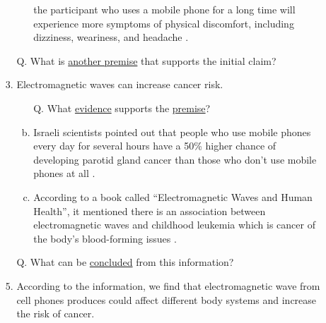 \documentclass[a4paper, 12pt]{article}
\begin{document}
\begin{CJK*}{UTF8}{bsmi}
\begin{enumerate}[I.]
\begin{enumerate}[A.]
\begin{enumerate}[1.]
\begin{enumerate}[a.]
                                                      the participant who uses a mobile phone for a long time will
                                                      experience more symptoms of physical discomfort,
                                                      including dizziness, weariness, and headache \parencite{R9631008}.
                                          \end{enumerate}
                                    \item [Q.] What is \underline{another premise} that supports the {\color{blue}initial claim}?
                                    \item Electromagnetic waves can increase cancer risk.
                                          \begin{enumerate}[a.]
                                                \item [Q.] What \underline{evidence} supports the \underline{premise}?
                                                \item Israeli scientists pointed out that people who use mobile
                                                      phones every day for several hours have a 50\% higher chance
                                                      of developing parotid gland cancer than
                                                      those who don't use mobile phones at all \parencite{epaper9706,10.1093/aje/kwm325}.
                                                \item According to a book called “Electromagnetic Waves and
                                                      Human Health”, it mentioned there is an association
                                                      between electromagnetic waves and childhood leukemia
                                                      which is cancer of the body's blood-forming issues \parencite{16094}.
                                          \end{enumerate}
                                    \item [Q.] What can be \underline{concluded} from this information?
                                    \item According to the information, we find that electromagnetic wave
                                          from cell phones produces could affect different body systems and
                                          increase the risk of cancer. %

\end{enumerate}
\end{enumerate}
\end{enumerate}
\end{CJK*}
\end{document}
